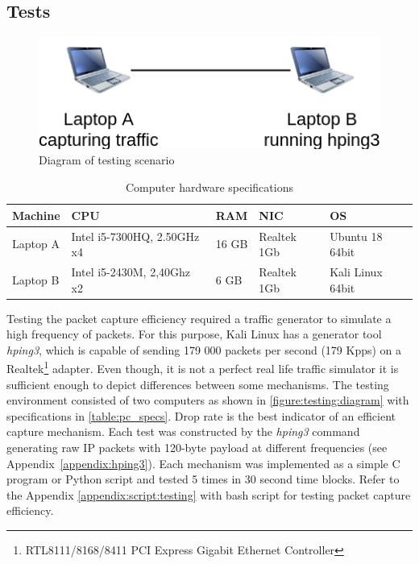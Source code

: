 \documentclass[12pt,a4paper,twoside]{book}
\begin{document}
        \subsection{Tests} \label{analysis:testing:tests}
            \begin{figure}[h]
                \centering
                \includegraphics[scale=0.5]{diagram}
                \caption{Diagram of testing scenario}
                \label{figure:testing:diagram}
            \end{figure}
            \begin{table}[h!]
            \centering
            \begin{tabular}{ |p{2.0cm}||p{3.0cm}|p{1.3cm}|p{1.2cm}|p{3.0cm}| }
                 \hline
                 Machine & CPU & RAM & NIC & OS \\
                 \hline
                 Laptop A & Intel i5-7300HQ, 2.50GHz x4 & 16 GB & Realtek 1Gb & Ubuntu 18 64bit \\
                 \hline
                 Laptop B & Intel i5-2430M, 2,40Ghz x2 & 6 GB & Realtek 1Gb & Kali Linux 64bit \\
                 \hline
            \end{tabular}
            \caption{Computer hardware specifications}
            \label{table:pc_specs}
            \end{table}    
            Testing the packet capture efficiency required a traffic generator to simulate a high frequency of packets. For this purpose, Kali Linux has a generator tool \emph{hping3}, which is capable of sending 179 000 packets per second (179 Kpps) on a Realtek\footnote{RTL8111/8168/8411 PCI Express Gigabit Ethernet Controller} adapter. Even though, it is not a perfect real life traffic simulator it is sufficient enough to depict differences between some mechanisms. The testing environment consisted of two computers as shown in \autoref{figure:testing:diagram} with specifications in \autoref{table:pc_specs}. Drop rate is the best indicator of an efficient capture mechanism. Each test was constructed by the \emph{hping3} command generating raw IP packets with 120-byte payload at different frequencies (see Appendix~\ref{appendix:hping3}). Each mechanism was implemented as a simple C program or Python script and tested 5 times in 30 second time blocks. Refer to the Appendix \ref{appendix:script:testing} with bash script for testing packet capture efficiency.\par        
\end{document}

